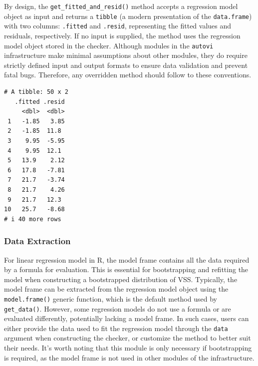 \documentclass[
doublespace,
  times]{anzsauth}
\newenvironment{Shaded}{\begin{snugshade}}{\end{snugshade}}
\newcommand{\FunctionTok}[1]{\textcolor[rgb]{0.28,0.35,0.67}{#1}}
\newcommand{\NormalTok}[1]{\textcolor[rgb]{0.00,0.23,0.31}{#1}}
\newcommand{\SpecialCharTok}[1]{\textcolor[rgb]{0.37,0.37,0.37}{#1}}
\begin{document}
By design, the \texttt{get\_fitted\_and\_resid()} method accepts a
regression model object as input and returns a \texttt{tibble} (a modern
presentation of the \texttt{data.frame}) with two columns:
\texttt{.fitted} and \texttt{.resid}, representing the fitted values and
residuals, respectively. If no input is supplied, the method uses the
regression model object stored in the checker. Although modules in the
\texttt{autovi} infrastructure make minimal assumptions about other
modules, they do require strictly defined input and output formats to
ensure data validation and prevent fatal bugs. Therefore, any overridden
method should follow to these conventions.

\begin{Shaded}
\end{Shaded}

\begin{verbatim}
# A tibble: 50 x 2
   .fitted .resid
     <dbl>  <dbl>
 1   -1.85   3.85
 2   -1.85  11.8 
 3    9.95  -5.95
 4    9.95  12.1 
 5   13.9    2.12
 6   17.8   -7.81
 7   21.7   -3.74
 8   21.7    4.26
 9   21.7   12.3 
10   25.7   -8.68
# i 40 more rows
\end{verbatim}

\subsubsection{Data Extraction}\label{data-extraction}

For linear regression model in R, the model frame contains all the data
required by a formula for evaluation. This is essential for
bootstrapping and refitting the model when constructing a bootstrapped
distribution of VSS. Typically, the model frame can be extracted from
the regression model object using the \texttt{model.frame()} generic
function, which is the default method used by \texttt{get\_data()}.
However, some regression models do not use a formula or are evaluated
differently, potentially lacking a model frame. In such cases, users can
either provide the data used to fit the regression model through the
\texttt{data} argument when constructing the checker, or customize the
method to better suit their needs. It's worth noting that this module is
only necessary if bootstrapping is required, as the model frame is not
used in other modules of the infrastructure.
\end{document}
